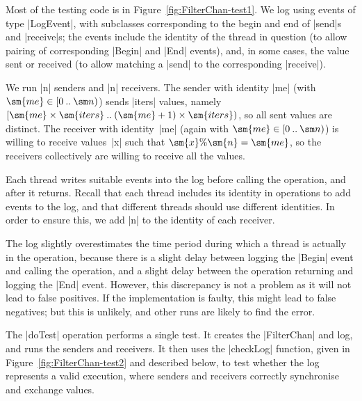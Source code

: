 
Most of the testing code is in Figure~\ref{fig:FilterChan-test1}. 
We log using events of type |LogEvent|, with subclasses corresponding to the
begin and end of |send|s and |receive|s; the events include the identity of
the thread in question (to allow pairing of corresponding |Begin| and |End|
events), and, in some cases, the value sent or received (to allow matching a
|send| to the corresponding |receive|).

We run |n| senders and |n| receivers.  The sender with identity |me| (with
$\sm{me} \in \interval{0}{\sm n}$) sends |iters| values, namely
$\interval{\sm{me} \times \sm{iters}}{(\sm{me}+1) \times \sm{iters}}$, so all
sent values are distinct.  The receiver with identity~|me| (again with
$\sm{me} \in \interval{0}{\sm n}$) is willing to receive values~|x| such that
$\sm{x}\%\sm{n} = \sm{me}$, so the receivers collectively are willing to
receive all the values.

Each thread writes suitable events into the log before calling the operation,
and after it returns.  Recall that each thread includes its
identity in operations to add events to the log, and that different threads
should use different identities.  In order to ensure this, we add |n| to the
identity of each receiver.

The log slightly overestimates the time period during which a thread is
actually in the operation, because there is a slight delay between logging the
|Begin| event and calling the operation, and a slight delay between the
operation returning and logging the |End| event.  However, this discrepancy is
not a problem as it will not lead to false positives.  If the implementation
is faulty, this might lead to false negatives; but this is unlikely, and other
runs are likely to find the error.

The |doTest| operation performs a single test.  It creates the |FilterChan|
and log, and runs the senders and receivers.  It then uses the |checkLog|
function, given in Figure~\ref{fig:FilterChan-test2} and described below, to
test whether the log represents a valid execution, where senders and receivers
correctly synchronise and exchange values.



